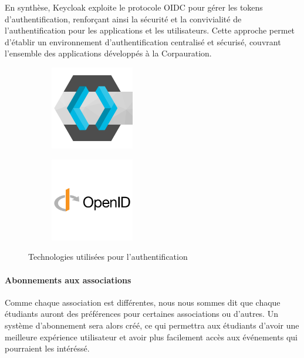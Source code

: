 En synthèse, Keycloak exploite le protocole OIDC pour gérer les tokens d'authentification, renforçant ainsi la sécurité et la convivialité de l'authentification pour les applications et les utilisateurs. Cette approche permet d'établir un environnement d'authentification centralisé et sécurisé, couvrant l'ensemble des applications développés à la Corpauration.

\begin{figure}
	\centering
	\begin{subfigure}{.45\textwidth}
		\centering
		\includegraphics[width=0.40\textwidth]{assets/keycloak.png}
		\label{fig:keycloak}
	\end{subfigure}
	\begin{subfigure}{.45\textwidth}
		\centering
		\includegraphics[width=0.40\textwidth]{assets/openid.png}
		\label{fig:openid}
	\end{subfigure}
	\caption{Technologies utilisées pour l'authentification}
\end{figure}

\paragraph{Abonnements aux associations}

Comme chaque association est différentes, nous nous sommes dit que chaque étudiants auront des préférences pour certaines associations ou d'autres. Un système d'abonnement sera alors créé, ce qui permettra aux étudiants d'avoir une meilleure expérience utilisateur et avoir plus facilement accès aux événements qui pourraient les intéréssé.


